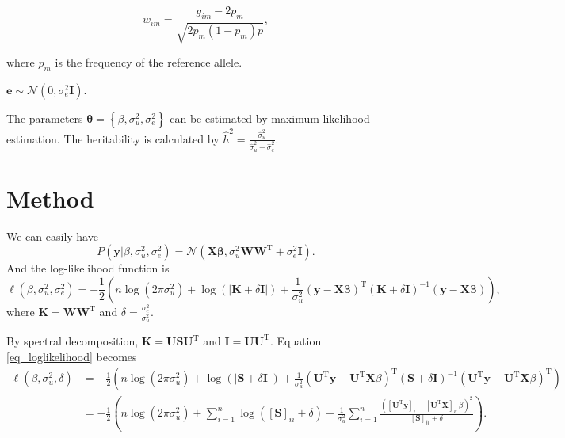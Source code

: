 \documentclass{article}
\begin{document}
\begin{equation}
	w_{im} = \frac{g_{im} - 2p_{m}}{\sqrt{2p_{m}(1-p_{m})p}},
\end{equation}

where $ p_{m} $ is the frequency of the reference allele.

$ \mathbf{e} \sim \mathcal{N} (0, \sigma^{2}_{e} \mathbf{I}) $.

The parameters $ \mathbf{\theta} = \left\lbrace \beta, \sigma^{2}_{u}, \sigma^{2}_{e} \right\rbrace $ can be estimated by maximum likelihood estimation. The heritability is calculated by $ \hat{h}^{2} = \frac{\hat{\sigma}^{2}_{u}}{\hat{\sigma}^{2}_{u} + \hat{\sigma}^{2}_{e}} $.

\section{Method}

We can easily have
\begin{equation}
	P(\mathbf{y} | \beta, \sigma^{2}_{u}, \sigma^{2}_{e}) = \mathcal{N}(\mathbf{X \beta}, \sigma^{2}_{u} \mathbf{WW}^{\mathrm{T}} + \sigma^{2}_{e}\mathbf{I}).
\end{equation}
And the log-likelihood function is
\begin{equation}\label{eq_loglikelihood}
	\ell(\beta, \sigma^{2}_{u}, \sigma^{2}_{e}) = -\frac{1}{2}( n \log(2 \pi \sigma^{2}_{u}) + \log(|\mathbf{K} + \delta \mathbf{I}|) + \frac{1}{\sigma^{2}_{u}} (\mathbf{y - X\beta})^{\mathrm{T}} (\mathbf{K} + \delta \mathbf{I})^{-1} (\mathbf{y - X\beta})),
\end{equation}
where $ \mathbf{K = WW}^{\mathrm{T}} $ and $ \delta = \frac{\sigma^{2}_{e}}{\sigma^{2}_{u}} $.
\vspace{1em}

By spectral decomposition, $ \mathbf{K = USU}^{\mathrm{T}} $ and $ \mathbf{I = UU}^{\mathrm{T}} $. Equation \ref{eq_loglikelihood} becomes
\begin{align}\label{eq_simplifedLoglikelihood}
		\ell(\beta, \sigma^{2}_{u}, \delta) &= -\frac{1}{2} \left( n \log(2 \pi \sigma^{2}_{u}) + \log(|\mathbf{S} + \delta \mathbf{I}|) +  \frac{1}{\sigma^{2}_{u}} (\mathbf{U}^{\mathrm{T}}\mathbf{y} -  \mathbf{U}^{\mathrm{T}}\mathbf{X}\beta)^{\mathrm{T}} (\mathbf{S} + \delta \mathbf{I})^{-1} (\mathbf{U}^{\mathrm{T}}\mathbf{y} -  \mathbf{U}^{\mathrm{T}}\mathbf{X}\beta)^{\mathrm{T}} \right) \\
		&=  -\frac{1}{2} \left(n \log(2 \pi \sigma^{2}_{u}) + \sum_{i=1}^{n}\log([\mathbf{S}]_{ii} + \delta) +  \frac{1}{\sigma^{2}_{u}} \sum_{i=1}^{n} \frac{([\mathbf{U}^{\mathrm{T}}\mathbf{y}]_{i} - [\mathbf{U}^{\mathrm{T}}\mathbf{X}]_{i:}\beta)^{2}}{[\mathbf{S}]_{ii} + \delta}\right).
\end{align}
\end{document}
